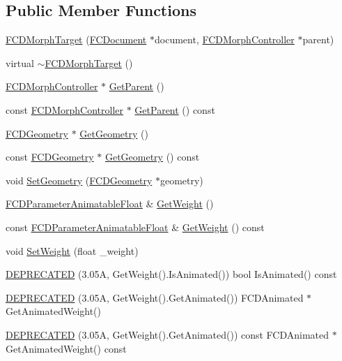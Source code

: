 \subsection*{Public Member Functions}
\begin{DoxyCompactItemize}
\item 
\hyperlink{classFCDMorphTarget_a3704c6c2176ffabe20c3b10ef3c36e90}{FCDMorphTarget} (\hyperlink{classFCDocument}{FCDocument} $\ast$document, \hyperlink{classFCDMorphController}{FCDMorphController} $\ast$parent)
\item 
virtual \hyperlink{classFCDMorphTarget_a751a40449c5a945fc233dd0a0ee32df7}{$\sim$FCDMorphTarget} ()
\item 
\hyperlink{classFCDMorphController}{FCDMorphController} $\ast$ \hyperlink{classFCDMorphTarget_a1cfed74a428ce68c944e487c335753f8}{GetParent} ()
\item 
const \hyperlink{classFCDMorphController}{FCDMorphController} $\ast$ \hyperlink{classFCDMorphTarget_a1e29057218a17fa7ab31b76fde8715cf}{GetParent} () const 
\item 
\hyperlink{classFCDGeometry}{FCDGeometry} $\ast$ \hyperlink{classFCDMorphTarget_ae96770062ed44c9fdb01681750b490c5}{GetGeometry} ()
\item 
const \hyperlink{classFCDGeometry}{FCDGeometry} $\ast$ \hyperlink{classFCDMorphTarget_ad21ba74ba248acddeef276d5e9298e24}{GetGeometry} () const 
\item 
void \hyperlink{classFCDMorphTarget_a998bd66544b91f0f41bbc2739acf65c2}{SetGeometry} (\hyperlink{classFCDGeometry}{FCDGeometry} $\ast$geometry)
\item 
\hyperlink{classFCDParameterAnimatableT}{FCDParameterAnimatableFloat} \& \hyperlink{classFCDMorphTarget_ad4e39bc98f3a51075ff634e06b41b698}{GetWeight} ()
\item 
const \hyperlink{classFCDParameterAnimatableT}{FCDParameterAnimatableFloat} \& \hyperlink{classFCDMorphTarget_a05c47b340b76af0d11a2de74dbb4a7e7}{GetWeight} () const 
\item 
void \hyperlink{classFCDMorphTarget_a1019a25890e87253afde129c4ad3e002}{SetWeight} (float \_\-weight)
\item 
\hyperlink{classFCDMorphTarget_a7086a6fcc6e9e10858e9a53dad2026d6}{DEPRECATED} (3.05A, GetWeight().IsAnimated()) bool IsAnimated() const 
\item 
\hyperlink{classFCDMorphTarget_abd8e297427d97a916989b8ac35c9ba4f}{DEPRECATED} (3.05A, GetWeight().GetAnimated()) FCDAnimated $\ast$GetAnimatedWeight()
\item 
\hyperlink{classFCDMorphTarget_a2a57b4224f12097e288e07c7574fa90e}{DEPRECATED} (3.05A, GetWeight().GetAnimated()) const FCDAnimated $\ast$GetAnimatedWeight() const 
\end{DoxyCompactItemize}


